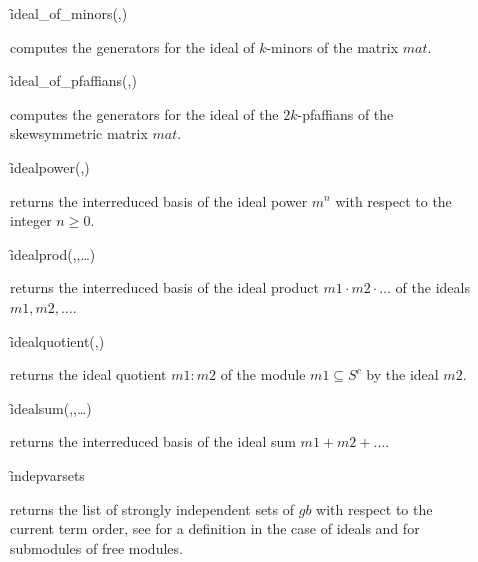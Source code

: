 \begin{description}
\item[]
  \begin{syntax}
    \f{ideal\_of\_minors}(,)
  \end{syntax}
  \hypertarget{operator:IDEAL_OF_MINORS}{}
computes the generators for the ideal of $k$-minors of the matrix
$mat$.

\item[]
  \begin{syntax}
    \f{ideal\_of\_pfaffians}(,)
  \end{syntax}
  \hypertarget{operator:IDEAL_OF_PFAFFIANS}{}
computes the generators for the ideal of the $2k$-pfaffians of
the skewsymmetric matrix $mat$.

\item[]
  \begin{syntax}
    \f{idealpower}(,)
  \end{syntax}
  \hypertarget{operator:IDEALPOWER}{}
returns the interreduced basis of the ideal power $m^n$ with
respect to the integer $n\geq 0$.

\item[]
  \begin{syntax}
    \f{idealprod}(,,\ldots)
  \end{syntax}
  \hypertarget{operator:IDEALPROD}{}
returns the interreduced basis of the ideal product
\mbox{$m1\cdot m2\cdot \ldots$} of the ideals $m1,m2,\ldots$.

\item[]
  \begin{syntax}
    \f{idealquotient}(,)
  \end{syntax}
  \hypertarget{operator:CALI_IDEALQUOTIENT}{}
returns the ideal quotient $m1:m2$ of the module $m1\subseteq
S^c$ by the ideal $m2$.

\item[]
  \begin{syntax}
    \f{idealsum}(,,\ldots)
  \end{syntax}
  \hypertarget{operator:CALI_IDEALSUM}{}
returns the interreduced basis of the ideal sum $m1+m2+\ldots$.

\item[]
  \begin{syntax}
    \f{indepvarsets} 
  \end{syntax}
  \hypertarget{operator:INDEPVARSETS}{}
returns the list of strongly independent sets of $gb$ with
respect to the current term order, see \cite{Kredel:88a} for a definition in
the case of ideals and \cite{Graebe:93a} for submodules of free modules.


\end{description}
